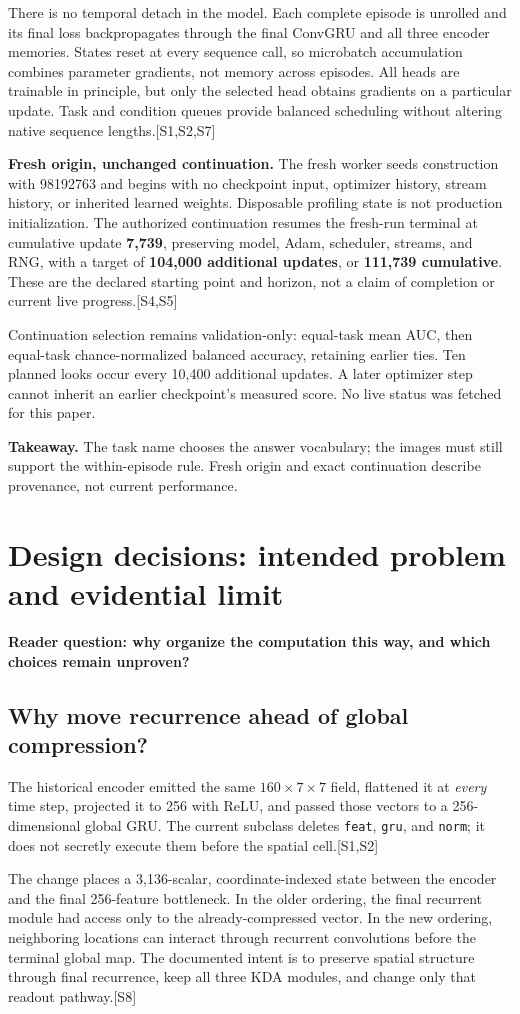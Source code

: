 \documentclass[10pt,letterpaper]{article}
\newcommand{\src}[1]{\textcolor{accent}{\textsf{[#1]}}}
\newcommand{\takeaway}[1]{\par\smallskip\noindent\textbf{Takeaway.} #1}
\newcommand{\psection}[1]{\clearpage\section{#1}}
\begin{document}
There is no temporal detach in the model. Each complete episode is unrolled and its final loss backpropagates through the final ConvGRU and all three encoder memories. States reset at every sequence call, so microbatch accumulation combines parameter gradients, not memory across episodes. All heads are trainable in principle, but only the selected head obtains gradients on a particular update. Task and condition queues provide balanced scheduling without altering native sequence lengths.\src{S1,S2,S7}

\textbf{Fresh origin, unchanged continuation.} The fresh worker seeds construction with 98192763 and begins with no checkpoint input, optimizer history, stream history, or inherited learned weights. Disposable profiling state is not production initialization. The authorized continuation resumes the fresh-run terminal at cumulative update \textbf{7,739}, preserving model, Adam, scheduler, streams, and RNG, with a target of \textbf{104,000 additional updates}, or \textbf{111,739 cumulative}. These are the declared starting point and horizon, not a claim of completion or current live progress.\src{S4,S5}

Continuation selection remains validation-only: equal-task mean AUC, then equal-task chance-normalized balanced accuracy, retaining earlier ties. Ten planned looks occur every 10,400 additional updates. A later optimizer step cannot inherit an earlier checkpoint's measured score. No live status was fetched for this paper.

\takeaway{The task name chooses the answer vocabulary; the images must still support the within-episode rule. Fresh origin and exact continuation describe provenance, not current performance.}

\psection{Design decisions: intended problem and evidential limit}
\textbf{Reader question: why organize the computation this way, and which choices remain unproven?}
\subsection{Why move recurrence ahead of global compression?}
The historical encoder emitted the same $160\times7\times7$ field, flattened it at \emph{every} time step, projected it to 256 with ReLU, and passed those vectors to a 256-dimensional global GRU. The current subclass deletes \texttt{feat}, \texttt{gru}, and \texttt{norm}; it does not secretly execute them before the spatial cell.\src{S1,S2}

The change places a 3,136-scalar, coordinate-indexed state between the encoder and the final 256-feature bottleneck. In the older ordering, the final recurrent module had access only to the already-compressed vector. In the new ordering, neighboring locations can interact through recurrent convolutions before the terminal global map. The documented intent is to preserve spatial structure through final recurrence, keep all three KDA modules, and change only that readout pathway.\src{S8}
\end{document}
